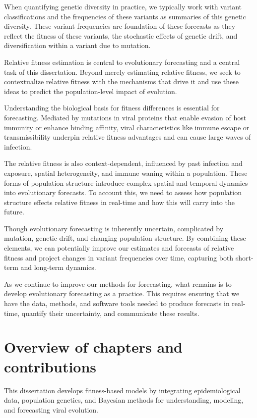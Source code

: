 When quantifying genetic diversity in practice, we typically work with variant classifications and the frequencies of these variants as summaries of this genetic diversity.
These variant frequencies are foundation of these forecasts as they reflect the fitness of these variants, the stochastic effects of genetic drift, and diversification within a variant due to mutation.

Relative fitness estimation is central to evolutionary forecasting and a central task of this dissertation.
Beyond merely estimating relative fitness, we seek to contextualize relative fitness with the mechanisms that drive it and use these ideas to predict the population-level impact of evolution.

Understanding the biological basis for fitness differences is essential for forecasting.
Mediated by mutations in viral proteins that enable evasion of host immunity or enhance binding affinity, viral characteristics like immune escape or transmissibility underpin relative fitness advantages and can cause large waves of infection.

The relative fitness is also context-dependent, influenced by past infection and exposure, spatial heterogeneity, and immune waning within a population.
These forms of population structure introduce complex spatial and temporal dynamics into evolutionary forecasts.
To account this, we need to assess how population structure effects relative fitness in real-time and how this will carry into the future.

Though evolutionary forecasting is inherently uncertain, complicated by mutation, genetic drift, and changing population structure.
By combining these elements, we can potentially improve our estimates and forecasts of relative fitness and project changes in variant frequencies over time, capturing both short-term and long-term dynamics.

As we continue to improve our methods for forecasting, what remains is to develop evolutionary forecasting as a practice.
This requires ensuring that we have the data, methods, and software tools needed to produce forecasts in real-time, quantify their uncertainty, and communicate these results.

\section{Overview of chapters and contributions}

This dissertation develops fitness-based models by integrating epidemiological data, population genetics, and Bayesian methods for understanding, modeling, and forecasting viral evolution. 

